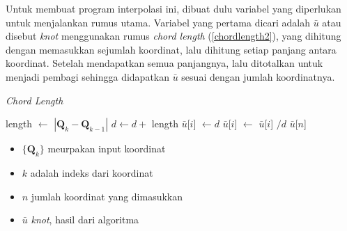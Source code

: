 Untuk membuat program interpolasi ini, dibuat dulu variabel
yang diperlukan untuk menjalankan rumus utama. Variabel
yang pertama dicari adalah $\bar{u}$ atau disebut \textit{knot} menggunakan
rumus \textit{chord length} (\ref*{chordlength2}), yang dihitung dengan
memasukkan sejumlah koordinat, lalu dihitung setiap panjang antara koordinat.
Setelah mendapatkan semua panjangnya, lalu ditotalkan untuk menjadi pembagi
sehingga didapatkan $\bar{u}$ sesuai dengan jumlah koordinatnya.
\begin{algorithm}[H]
  \caption{\textit{Chord Length}}
  \begin{algorithmic}[1]
     
      \State length $\gets$ $|\textbf{Q}_k - \textbf{Q}_{k-1}|$
      \State $d \gets d +$ length
      \State $\bar{u}$[$i$] $\gets d$
    \EndFor
     
      \State $\bar{u}$[$i$] $\gets$ $\bar{u}$[$i$] $/ d$
    \EndFor
    \State \Return $\bar{u}$[$n$]
  \EndFunction
  \end{algorithmic}
  \label{algoritma:chordlength}
\end{algorithm}
\begin{itemize}
  \setlength{\itemsep}{0pt}
  \setlength{\parskip}{0pt}
  \setlength{\parsep}{0pt}
  \item $\{\textbf{Q}_k\}$ meurpakan input koordinat
  \item $k$ adalah indeks dari koordinat
  \item $n$ jumlah koordinat yang dimasukkan
  \item $\bar{u}$ \textit{knot}, hasil dari algoritma
\end{itemize}

